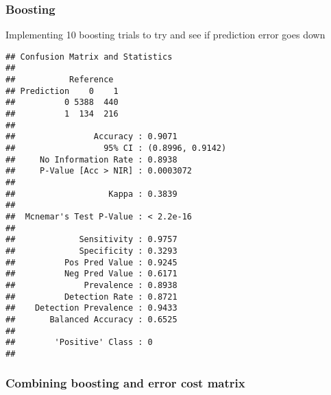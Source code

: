 \documentclass[
]{article}
\newenvironment{Shaded}{\begin{snugshade}}{\end{snugshade}}
\newcommand{\AttributeTok}[1]{\textcolor[rgb]{0.77,0.63,0.00}{#1}}
\newcommand{\CommentTok}[1]{\textcolor[rgb]{0.56,0.35,0.01}{\textit{#1}}}
\newcommand{\DecValTok}[1]{\textcolor[rgb]{0.00,0.00,0.81}{#1}}
\newcommand{\FunctionTok}[1]{\textcolor[rgb]{0.00,0.00,0.00}{#1}}
\newcommand{\NormalTok}[1]{#1}
\newcommand{\OtherTok}[1]{\textcolor[rgb]{0.56,0.35,0.01}{#1}}
\newcommand{\SpecialCharTok}[1]{\textcolor[rgb]{0.00,0.00,0.00}{#1}}
\begin{document}
\hypertarget{boosting}{%
\subsubsection{Boosting}\label{boosting}}

Implementing 10 boosting trials to try and see if prediction error goes
down

\begin{Shaded}
\end{Shaded}

\begin{verbatim}
## Confusion Matrix and Statistics
## 
##           Reference
## Prediction    0    1
##          0 5388  440
##          1  134  216
##                                           
##                Accuracy : 0.9071          
##                  95% CI : (0.8996, 0.9142)
##     No Information Rate : 0.8938          
##     P-Value [Acc > NIR] : 0.0003072       
##                                           
##                   Kappa : 0.3839          
##                                           
##  Mcnemar's Test P-Value : < 2.2e-16       
##                                           
##             Sensitivity : 0.9757          
##             Specificity : 0.3293          
##          Pos Pred Value : 0.9245          
##          Neg Pred Value : 0.6171          
##              Prevalence : 0.8938          
##          Detection Rate : 0.8721          
##    Detection Prevalence : 0.9433          
##       Balanced Accuracy : 0.6525          
##                                           
##        'Positive' Class : 0               
## 
\end{verbatim}

\hypertarget{combining-boosting-and-error-cost-matrix}{%
\subsubsection{Combining boosting and error cost
matrix}\label{combining-boosting-and-error-cost-matrix}}
\end{document}
